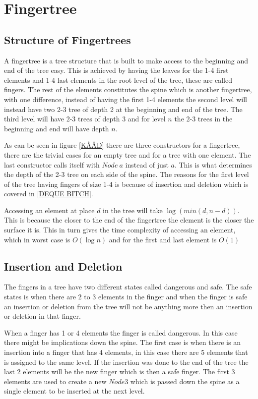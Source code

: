 \section{Fingertree}
\subsection{Structure of Fingertrees}
A fingertree is a tree structure that is built to make access to the beginning
and end of the tree easy. This is achieved by having the leaves for the 1-4
first elements and 1-4 last elements in the root level of the tree, these are
called fingers. The rest of
the elements constitutes the spine which is another fingertree, with one
difference, instead of having the first 1-4 elements the second level will
instead have two 2-3 tree of depth 2 at the beginning and end of the tree. The
third level will have 2-3 trees of depth 3 and for level $n$ the 2-3 trees in
the beginning and end will have depth $n$.


As can be seen in figure \cref{KÅÅD} there are three constructors for a
fingertree, there are the trivial cases for an empty tree and for a tree with
one element. The last constructor calls itself with $Node~a$ instead of just $a$.
This is what determines the depth of the 2-3 tree on each side of the spine. The
reasons for the first level of the tree having fingers of size 1-4 is because of
insertion and deletion which is covered in \cref{DEQUE BITCH}.

Accessing an element at place $d$ in the tree will take $\log(min(d,n-d))$. This
is because the closer to the end of the fingertree the element is the closer the
surface it is. This in turn gives the time complexity of accessing an element,
which in worst case is $O(\log n)$ and for the first and last element is $O(1)$

\subsection{Insertion and Deletion}
The fingers in a tree have two different states called dangerous and safe. The
safe states is when there are 2 to 3 elements in the finger and when the finger
is safe an insertion or deletion from the tree will not be anything more then an
insertion or deletion in that finger.

When a finger has 1 or 4 elements the finger is called dangerous. In this case
there might be implications down the spine. The first case is when there is an
insertion into a finger that has 4 elements, in this case there are 5 elements
that is assigned to the same level. If the insertion was done to the end of the
tree the last 2 elements will be the new finger which is then a safe finger. The
first 3 elements are used to create a new $Node3$ which is passed down the spine
as a single element to be inserted at the next level.

